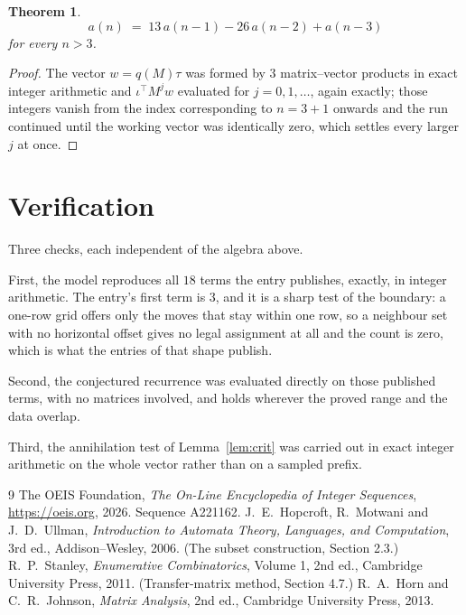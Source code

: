 \documentclass[11pt,a4paper]{article}
\theoremstyle{plain}
\newtheorem{theorem}{Theorem}
\theoremstyle{definition}
\begin{document}
\begin{theorem}
\[
a(n)\;=\;13\,a(n-1) - 26\,a(n-2) + a(n-3)
\]
for every $n>3$.
\end{theorem}

\begin{proof}
The vector $w=q(M)\tau$ was formed by $3$ matrix--vector products in exact integer
arithmetic and $\iota^{\!\top}M^{j}w$ evaluated for $j=0,1,\dots$, again exactly; those
integers vanish from the index corresponding to $n=3+1$ onwards and the run continued
until the working vector was identically zero, which settles every larger $j$ at once.
\end{proof}

\section{Verification}

Three checks, each independent of the algebra above.

First, the model reproduces all $18$ terms the entry publishes, exactly, in integer
arithmetic. The entry's first term is $3$, and it is a sharp test of the boundary: a
one-row grid offers only the moves that stay within one row, so a neighbour set with no
horizontal offset gives no legal assignment at all and the count is zero, which is what the
entries of that shape publish.

Second, the conjectured recurrence was evaluated directly on those published terms, with no
matrices involved, and holds wherever the proved range and the data overlap.

Third, the annihilation test of Lemma~\ref{lem:crit} was carried out in exact integer
arithmetic on the whole vector rather than on a sampled prefix.

\begin{thebibliography}{9}
 The OEIS Foundation, \emph{The On-Line Encyclopedia of Integer
Sequences}, \url{https://oeis.org}, 2026. Sequence A221162.
 J.~E.~Hopcroft, R.~Motwani and J.~D.~Ullman, \emph{Introduction to Automata
Theory, Languages, and Computation}, 3rd ed., Addison--Wesley, 2006. (The subset
construction, Section 2.3.)
 R.~P.~Stanley, \emph{Enumerative Combinatorics}, Volume 1, 2nd ed.,
Cambridge University Press, 2011. (Transfer-matrix method, Section 4.7.)
 R.~A.~Horn and C.~R.~Johnson, \emph{Matrix Analysis}, 2nd ed., Cambridge
University Press, 2013.
\end{thebibliography}
\end{document}
